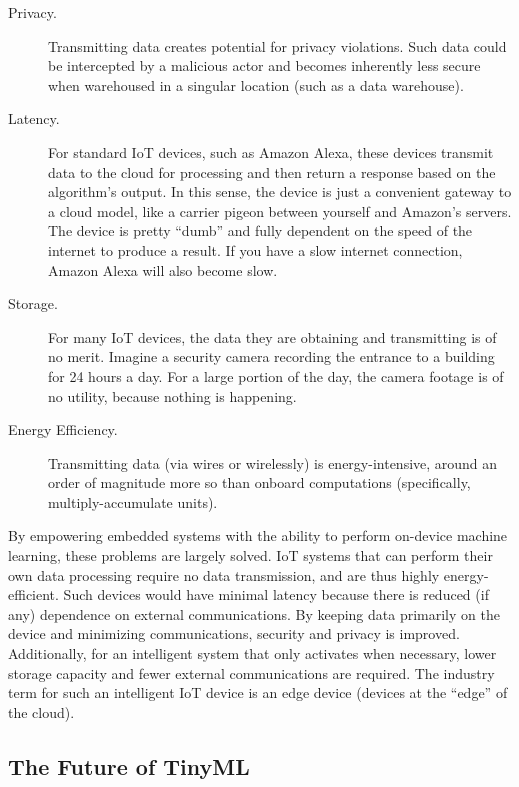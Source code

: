 \begin{description}
  \item [Privacy.] Transmitting data creates potential for privacy violations. Such data could be intercepted by a malicious actor and becomes inherently less secure when warehoused in a singular location (such as a data warehouse).

  \item [Latency.] For standard IoT devices, such as Amazon Alexa, these devices transmit data to the cloud for processing and then return a response based on the algorithm’s output. In this sense, the device is just a convenient gateway to a cloud model, like a carrier pigeon between yourself and Amazon’s servers. The device is pretty “dumb” and fully dependent on the speed of the internet to produce a result. If you have a slow internet connection, Amazon Alexa will also become slow.

  \item [Storage.] For many IoT devices, the data they are obtaining and transmitting is of no merit. Imagine a security camera recording the entrance to a building for 24 hours a day. For a large portion of the day, the camera footage is of no utility, because nothing is happening.

  \item [Energy Efficiency.] Transmitting data (via wires or wirelessly) is energy-intensive, around an order of magnitude more so than onboard computations (specifically, multiply-accumulate units).
\end{description}


By empowering embedded systems with the ability to perform on-device machine learning, these problems are largely solved. IoT systems that can perform their own data processing require no data transmission, and are thus highly energy-efficient. Such devices would have minimal latency because there is reduced (if any) dependence on external communications. By keeping data primarily on the device and minimizing communications, security and privacy is improved. Additionally, for an intelligent system that only activates when necessary, lower storage capacity and fewer external communications are required. The industry term for such an intelligent IoT device is an edge device (devices at the “edge” of the cloud).

\subsection{The Future of TinyML}

